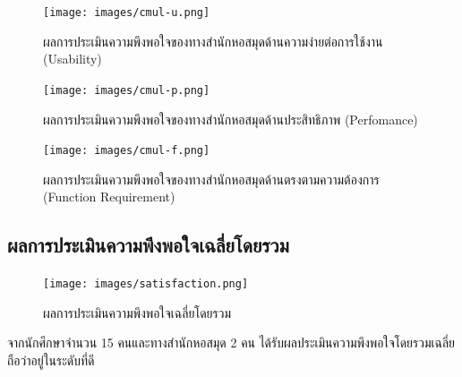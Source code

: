 \newpage
\begin{figure}[ht]
    \centering
    \texttt{[image: images/cmul-u.png]}
    \caption[ผลการประเมินความพึงพอใจของทางสำนักหอสมุดด้านความง่ายต่อการใช้งาน (Usability)]{ผลการประเมินความพึงพอใจของทางสำนักหอสมุดด้านความง่ายต่อการใช้งาน (Usability)}
    \label{fig:cmul-u}
\end{figure}
\begin{figure}[ht]
    \centering
    \texttt{[image: images/cmul-p.png]}
    \caption[ผลการประเมินความพึงพอใจของทางสำนักหอสมุดด้านประสิทธิภาพ (Perfomance)]{ผลการประเมินความพึงพอใจของทางสำนักหอสมุดด้านประสิทธิภาพ (Perfomance)}
    \label{fig:cmul-p}
\end{figure}
\newpage
\begin{figure}[ht]
    \centering
    \texttt{[image: images/cmul-f.png]}
    \caption[ผลการประเมินความพึงพอใจของทางสำนักหอสมุดด้านตรงตามความต้องการ (Function Requirement)]{ผลการประเมินความพึงพอใจของทางสำนักหอสมุดด้านตรงตามความต้องการ (Function Requirement)}
    \label{fig:cmul-f}
\end{figure}

\newpage
\subsection{ผลการประเมินความพึงพอใจเฉลี่ยโดยรวม}
\begin{figure}[ht]
    \centering
    \texttt{[image: images/satisfaction.png]}
    \caption[ผลการประเมินความพึงพอใจเฉลี่ยโดยรวม]{ผลการประเมินความพึงพอใจเฉลี่ยโดยรวม}
    \label{fig:satisfaction}
\end{figure}
จากนักศึกษาจำนวน 15 คนและทางสำนักหอสมุด 2 คน ได้รับผลประเมินความพึงพอใจโดยรวมเฉลี่ยถือว่าอยู่ในระดับที่ดี

